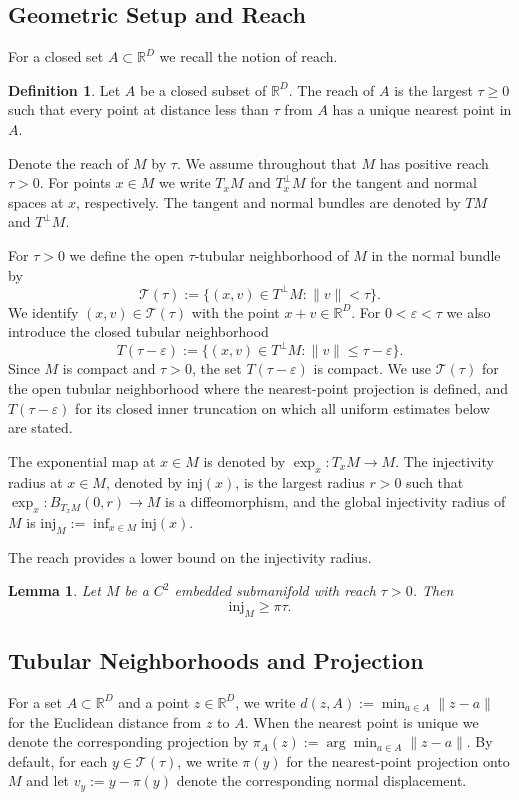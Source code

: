\documentclass[11pt]{article}
\theoremstyle{plain}
\newtheorem{lemma}[theorem]{Lemma}
\theoremstyle{definition}
\newtheorem{definition}[theorem]{Definition}
\begin{document}
\subsection{Geometric Setup and Reach}
For a closed set $A\subset \mathbb{R}^D$ we recall the notion of reach.
\begin{definition}\label{def:reach}
    Let $A$ be a closed subset of $\mathbb{R}^D$. The reach of $A$ is the largest $\tau\ge 0$ such that every point at distance less than $\tau$ from $A$ has a unique nearest point in $A$.
\end{definition}
Denote the reach of $M$ by $\tau$. We assume throughout that $M$ has positive reach $\tau > 0$. For points $x \in M$ we write $T_x M$ and $T_x^\perp M$ for the tangent and normal spaces at $x$, respectively. The tangent and normal bundles are denoted by $TM$ and $T^\perp M$. 

For $\tau > 0$ we define the open $\tau$-tubular neighborhood of $M$ in the normal bundle by
\[
  \mathcal{T}(\tau) := \{ (x,v) \in T^\perp M : \|v\| < \tau \}.
\]
We identify $(x,v) \in \mathcal{T}(\tau)$ with the point $x + v \in \mathbb{R}^D$. For $0<\varepsilon<\tau$ we also introduce the closed tubular neighborhood
\[
  T(\tau - \varepsilon) := \{ (x,v) \in T^\perp M : \|v\| \le \tau - \varepsilon \}.
\]
Since $M$ is compact and $\tau > 0$, the set $T(\tau - \varepsilon)$ is compact. We use $\mathcal T(\tau)$ for the open tubular neighborhood where the nearest-point projection is defined, and $T(\tau-\varepsilon)$ for its closed inner truncation on which all uniform estimates below are stated.

The exponential map at $x \in M$ is denoted by $  \exp_x\colon  T_x M \to M$. The injectivity radius at $x \in M$, denoted by $\mathrm{inj}(x)$, is the largest radius $r>0$ such that $\exp_x\colon B_{T_xM}(0,r)\to M$ is a diffeomorphism, and the global injectivity radius of $M$ is $\mathrm{inj}_M := \inf_{x \in M} \mathrm{inj}(x).$

The reach provides a lower bound on the injectivity radius.
\begin{lemma}\label{lem:injectivity-radius} \citep[Corollary~4]{Alexander2005GaussEA}
    Let $M$ be a $C^2$ embedded submanifold with reach $\tau>0$. Then
    \[
    \mathrm{inj}_M \ge \pi\tau.
    \]
\end{lemma}


\subsection{Tubular Neighborhoods and Projection}
For a set $A \subset \mathbb{R}^D$ and a point $z \in \mathbb{R}^D$, we write $  d(z,A) := \min_{a \in A} \|z - a\|$ for the Euclidean distance from $z$ to $A$. When the nearest point is unique we denote the corresponding projection by $\pi_A(z) := \arg \min_{a \in A} \|z - a\|$. By default, for each $y\in \mathcal T(\tau)$, we write $\pi(y)$ for the nearest-point projection onto $M$ and let $v_y := y - \pi(y)$ denote the corresponding normal displacement.
\end{document}
